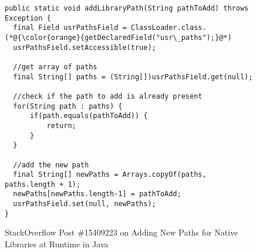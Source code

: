 \begin{figure}[htbp]
	\centering
\begin{lstlisting}[]
public static void addLibraryPath(String pathToAdd) throws Exception {
  final Field usrPathsField = ClassLoader.class.(*@{\color{orange}{getDeclaredField("usr\_paths");}@*)
  usrPathsField.setAccessible(true);

  //get array of paths
  final String[] paths = (String[])usrPathsField.get(null);

  //check if the path to add is already present
  for(String path : paths) {
      if(path.equals(pathToAdd)) {
          return;
      }
  }

  //add the new path
  final String[] newPaths = Arrays.copyOf(paths, paths.length + 1);
  newPaths[newPaths.length-1] = pathToAdd;
  usrPathsField.set(null, newPaths);
}
\end{lstlisting}
        \vspace{-12pt}
        \caption{StackOverflow Post \#15409223 on Adding New Paths for
          Native Libraries at Runtime in Java}
        \label{fig:example1}
\end{figure}
